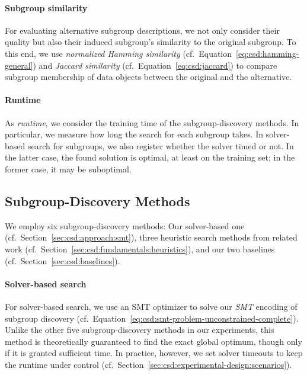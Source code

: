 \documentclass{article}
\theoremstyle{definition}
\begin{document}
\paragraph{Subgroup similarity}

For evaluating alternative subgroup descriptions, we not only consider their quality but also their induced subgroup's similarity to the original subgroup.
To this end, we use \emph{normalized Hamming similarity} (cf.~Equation~\ref{eq:csd:hamming-general}) and \emph{Jaccard similarity} (cf.~Equation~\ref{eq:csd:jaccard}) to compare subgroup membership of data objects between the original and the alternative.

\paragraph{Runtime}

As \emph{runtime}, we consider the training time of the subgroup-discovery methods.
In particular, we measure how long the search for each subgroup takes.
In solver-based search for subgroups, we also register whether the solver timed or not.
In the latter case, the found solution is optimal, at least on the training set; in the former case, it may be suboptimal.

\subsection{Subgroup-Discovery Methods}
\label{sec:csd:experimental-design:methods}

We employ six subgroup-discovery methods:
Our solver-based one (cf.~Section~\ref{sec:csd:approach:smt}), three heuristic search methods from related work (cf.~Section~\ref{sec:csd:fundamentals:heuristics}), and our two baselines (cf.~Section~\ref{sec:csd:baselines}).

\paragraph{Solver-based search}

For solver-based search, we use an SMT optimizer to solve our \emph{SMT} encoding of subgroup discovery (cf.~Equation~\ref{eq:csd:smt-problem-unconstrained-complete}).
Unlike the other five subgroup-discovery methods in our experiments, this method is theoretically guaranteed to find the exact global optimum, though only if it is granted sufficient time.
In practice, however, we set solver timeouts to keep the runtime under control (cf.~Section~\ref{sec:csd:experimental-design:scenarios}).
\end{document}
